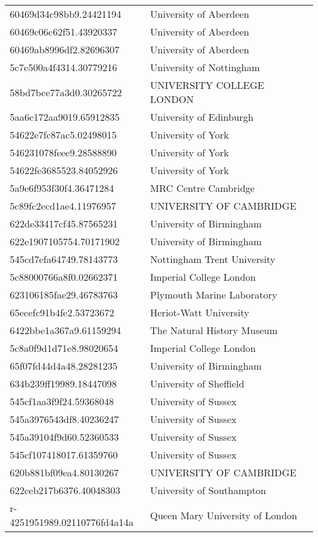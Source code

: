 \begin{tabular}{ll}
60469d34c98bb9.24421194 & University of Aberdeen \\
60469c06c62f51.43920337 & University of Aberdeen \\
60469ab8996df2.82696307 & University of Aberdeen \\
5c7e500a4f4314.30779216 & University of Nottingham \\
58bd7bce77a3d0.30265722 & UNIVERSITY COLLEGE LONDON \\
5aa6c172aa9019.65912835 & University of Edinburgh \\
54622e7fc87ac5.02498015 & University of York \\
546231078feee9.28588890 & University of York \\
54622fe3685523.84052926 & University of York \\
5a9e6f953f30f4.36471284 & MRC Centre Cambridge \\
5c89fc2ecd1ae4.11976957 & UNIVERSITY OF CAMBRIDGE \\
622de33417cf45.87565231 & University of Birmingham \\
622e1907105754.70171902 & University of Birmingham \\
545cd7efa64749.78143773 & Nottingham Trent University \\
5c88000766a8f0.02662371 & Imperial College London \\
623106185fae29.46783763 & Plymouth Marine Laboratory \\
65ecefc91b4fe2.53723672 & Heriot-Watt University \\
6422bbe1a367a9.61159294 & The Natural History Museum \\
5c8a0f9d1d71e8.98020654 & Imperial College London \\
65f07fd44d4a48.28281235 & University of Birmingham \\
634b239ff19989.18447098 & University of Sheffield \\
545cf1aa3f9f24.59368048 & University of Sussex \\
545a3976543df8.40236247 & University of Sussex \\
545a39104f9d60.52360533 & University of Sussex \\
545cf107418017.61359760 & University of Sussex \\
620b881bf09ea4.80130267 & UNIVERSITY OF CAMBRIDGE \\
622ceb217b6376.40048303 & University of Southampton \\
r-4251951989.02110776fd4a14a & Queen Mary University of London \\

\end{tabular}
